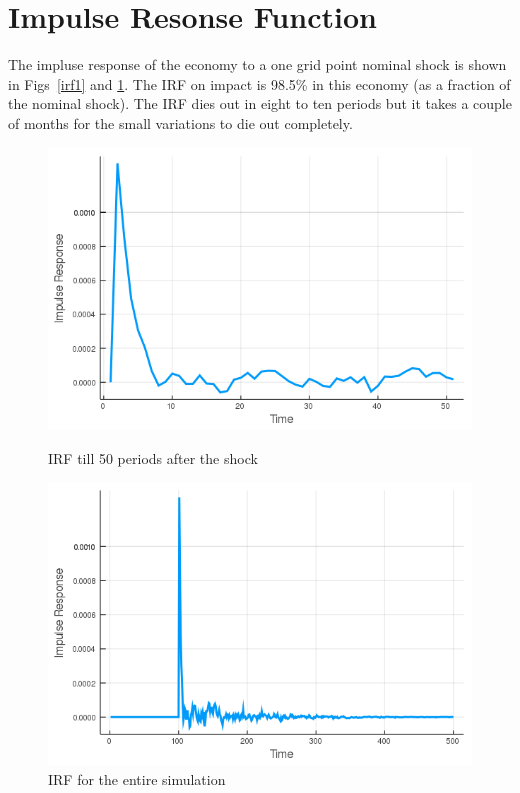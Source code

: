 
\section{Impulse Resonse Function}

The impluse response of the economy to a one grid point nominal shock is shown in Figs~\ref{irf1} and \ref{irf2}. The IRF on impact is 98.5\% in this economy (as a fraction of the nominal shock). The IRF dies out in eight to ten periods but it takes a couple of months for the small variations to die out completely.
\begin{figure}[H]
    \centering
    \begin{minipage}{0.48\textwidth}
        \centering
        \includegraphics[width = \textwidth]{../tasks/Golosov_lucas/output/C_irf_50_periods.png}
        \caption{IRF till 50 periods after the shock}
        \label{irf1}
    \end{minipage}
    \begin{minipage}{0.48\textwidth}
        \centering
        \includegraphics[width=\textwidth]{../tasks/Golosov_lucas/output/C_irf_500_periods.png}
        \caption{IRF for the entire simulation}
        \label{irf2}
    \end{minipage}
\end{figure}

